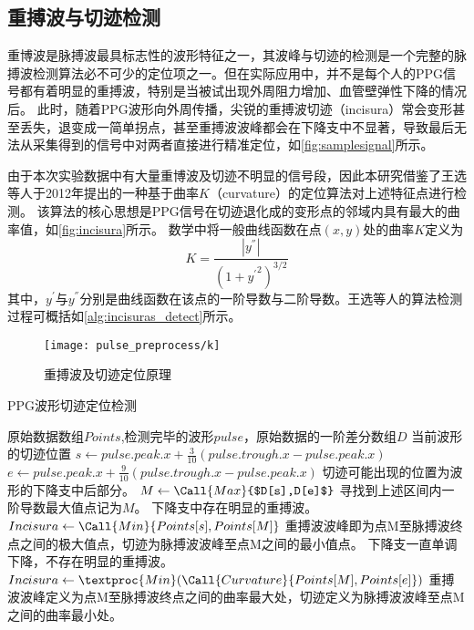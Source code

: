 \subsection{重搏波与切迹检测}
重博波是脉搏波最具标志性的波形特征之一，其波峰与切迹的检测是一个完整的脉搏波检测算法必不可少的定位项之一\cite{Wang2012}。但在实际应用中，并不是每个人的PPG信号都有着明显的重搏波，特别是当被试出现外周阻力增加、血管壁弹性下降的情况后\cite{mmt}。
此时，随着PPG波形向外周传播，尖锐的重搏波切迹（incisura）常会变形甚至丢失，退变成一简单拐点，甚至重搏波波峰都会在下降支中不显著，导致最后无法从采集得到的信号中对两者直接进行精准定位，如\autoref{fig:samplesignal}所示。

由于本次实验数据中有大量重博波及切迹不明显的信号段，因此本研究借鉴了王选等人于2012年提出的一种基于曲率$K$（curvature）的定位算法对上述特征点进行检测\cite{Wang2012}。
该算法的核心思想是PPG信号在切迹退化成的变形点的邻域内具有最大的曲率值，如\autoref{fig:incisura}所示。
数学中将一般曲线函数在点$(x,y)$处的曲率$K$定义为
\begin{equation}
    \label{equ:curvature}
    K=\frac{|y^{''}|}{{(1+{y^{'}}^2)}^{3/2}}
\end{equation}
其中，$y^{'}$与$y^{''}$分别是曲线函数在该点的一阶导数与二阶导数。王选等人的算法检测过程可概括如\autoref{alg:incisuras_detect}所示\cite{Wang2012}。
\begin{figure}[htbp]
    \centering
    \texttt{[image: pulse\_preprocess/k]}
    \caption{\label{fig:incisura}重搏波及切迹定位原理}
\end{figure}

\begin{breakablealgorithm}
    \caption{PPG波形切迹定位检测}
    \label{alg:incisuras_detect}
    \begin{algorithmic}[1] %
        \Require 原始数据数组$Points$,检测完毕的波形$pulse$，原始数据的一阶差分数组$D$
        \Ensure 当前波形的切迹位置
            \State $s \gets pulse.peak.x + \frac{3}{10}(pulse.trough.x-pulse.peak.x)$
            \State $e \gets pulse.peak.x + \frac{9}{10}(pulse.trough.x-pulse.peak.x)$
            \State \Comment 切迹可能出现的位置为波形的下降支中后部分。
            \State $M  \gets \Call{Max}{$D[s],D[e]$}$
            \State \Comment 寻找到上述区间内一阶导数最大值点记为$M$。
                \State \Comment 下降支中存在明显的重搏波。
                \State $Incisura \gets \Call{Min}{Points[s],Points[M]}$
                \State \Comment 重搏波波峰即为点M至脉搏波终点之间的极大值点，切迹为脉搏波波峰至点M之间的最小值点。
            \Else
                \State \Comment 下降支一直单调下降，不存在明显的重搏波。
                \State $Incisura \gets \textproc{Min}({\Call{Curvature}{Points[M],Points[e]}})$
                \State \Comment 重搏波波峰定义为点M至脉搏波终点之间的曲率最大处，切迹定义为脉搏波波峰至点M之间的曲率最小处。
            \EndIf
            \State {}
        \EndFunction
    \end{algorithmic}
\end{breakablealgorithm}

